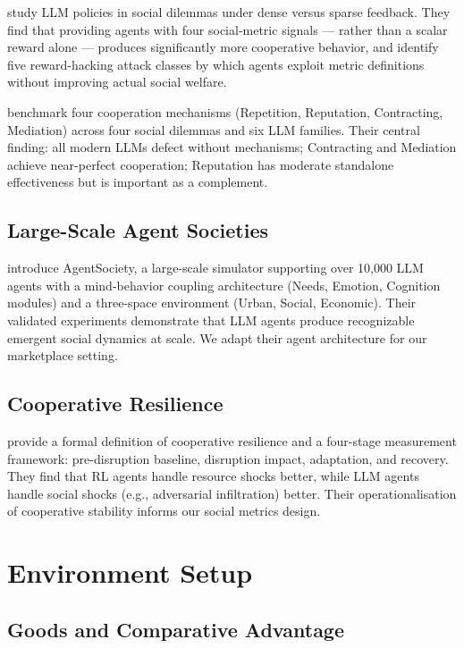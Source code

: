\documentclass[12pt, a4paper]{article}
\begin{document}
\citet{gallego2024} study LLM policies in social dilemmas under dense versus sparse feedback. They find that providing agents with four social-metric signals — rather than a scalar reward alone — produces significantly more cooperative behavior, and identify five reward-hacking attack classes by which agents exploit metric definitions without improving actual social welfare.

\citet{coopeval} benchmark four cooperation mechanisms (Repetition, Reputation, Contracting, Mediation) across four social dilemmas and six LLM families. Their central finding: all modern LLMs defect without mechanisms; Contracting and Mediation achieve near-perfect cooperation; Reputation has moderate standalone effectiveness but is important as a complement.

\subsection{Large-Scale Agent Societies}

\citet{agentsociety} introduce AgentSociety, a large-scale simulator supporting over 10,000 LLM agents with a mind-behavior coupling architecture (Needs, Emotion, Cognition modules) and a three-space environment (Urban, Social, Economic). Their validated experiments demonstrate that LLM agents produce recognizable emergent social dynamics at scale. We adapt their agent architecture for our marketplace setting.

\subsection{Cooperative Resilience}

\citet{chaconresilience} provide a formal definition of cooperative resilience and a four-stage measurement framework: pre-disruption baseline, disruption impact, adaptation, and recovery. They find that RL agents handle resource shocks better, while LLM agents handle social shocks (e.g., adversarial infiltration) better. Their operationalisation of cooperative stability informs our social metrics design.

\section{Environment Setup}
\label{sec:environment}

\subsection{Goods and Comparative Advantage}
\end{document}

